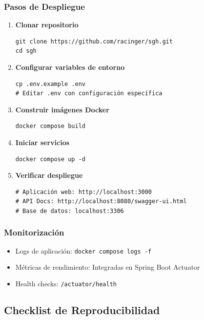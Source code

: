 \subsubsection{Pasos de Despliegue}
\begin{enumerate}
\item \textbf{Clonar repositorio}
\begin{verbatim}
git clone https://github.com/racinger/sgh.git
cd sgh
\end{verbatim}

\item \textbf{Configurar variables de entorno}
\begin{verbatim}
cp .env.example .env
# Editar .env con configuración específica
\end{verbatim}

\item \textbf{Construir imágenes Docker}
\begin{verbatim}
docker compose build
\end{verbatim}

\item \textbf{Iniciar servicios}
\begin{verbatim}
docker compose up -d
\end{verbatim}

\item \textbf{Verificar despliegue}
\begin{verbatim}
# Aplicación web: http://localhost:3000
# API Docs: http://localhost:8080/swagger-ui.html
# Base de datos: localhost:3306
\end{verbatim}
\end{enumerate}

\subsubsection{Monitorización}
\begin{itemize}
\item Logs de aplicación: \texttt{docker compose logs -f}
\item Métricas de rendimiento: Integradas en Spring Boot Actuator
\item Health checks: \texttt{/actuator/health}
\end{itemize}

\subsection{Checklist de Reproducibilidad}

